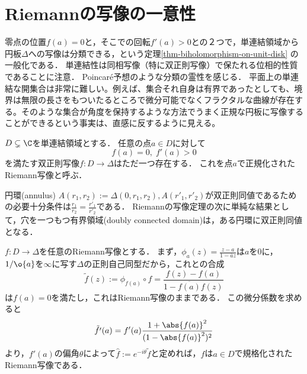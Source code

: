 \documentclass[uplatex, dvipdfmx]{jsreport}
\begin{document}
\section{Riemannの写像の一意性}

\begin{tcolorbox}[colframe=ForestGreen, colback=ForestGreen!10!white,breakable,colbacktitle=ForestGreen!40!white,coltitle=black,fonttitle=\bfseries\sffamily,
title=２次元領域分類の霊性]
    零点の位置$f(a)=0$と，そこでの回転$f'(a)>0$との２つで，単連結領域から円板$\Delta$への写像は分類できる，という定理\ref{thm-biholomorphism-on-unit-disk}
    の一般化である．
    単連結性は同相写像（特に双正則写像）で保たれる位相的性質であることに注意．
    Poincaré予想のような分類の霊性を感じる．
    平面上の単連結な開集合は非常に難しい。例えば、集合それ自身は有界であったとしても、境界は無限の長さをもついたるところで微分可能でなくフラクタルな曲線が存在する。そのような集合が角度を保持するような方法でうまく正規な円板に写像することができるという事実は、直感に反するように見える。
\end{tcolorbox}

\begin{theorem}\label{thm-Riemann-mapping-theorem}
    $D\subsetneq\C$を単連結領域とする．
    任意の点$a\in D$に対して
    \[f(a)=0,\;f'(a)>0\]
    を満たす双正則写像$f:D\to\Delta$はただ一つ存在する．
    これを点$a$で正規化されたRiemann写像と呼ぶ．
\end{theorem}
\begin{remark}[単連結でない領域の消息]
    円環(annulus) $A(r_1,r_2):=\Delta(0,r_1,r_2),A(r'_1,r'_2)$が双正則同値であるための必要十分条件は$\frac{r_1}{r_2}=\frac{r'_1}{r'_2}$である．
    Riemannの写像定理の次に単純な結果として，穴を一つもつ有界領域(doubly connected domain)は，ある円環に双正則同値となる．
\end{remark}

\begin{discussion}
    $f:D\to\Delta$を任意のRiemann写像とする．
    まず，$\phi_a(z)=\frac{z-a}{1-\overline{a}z}$は$a$を$0$に，$1/\o{a}$を$\infty$に写す$\Delta$の正則自己同型だから，これとの合成
    \[\tilde{f}(z):=\phi_{f(a)}\circ f=\frac{f(z)-f(a)}{1-\overline{f(a)}f(z)}\]
    は$f(a)=0$を満たし，これはRiemann写像のままである．
    この微分係数を求めると
    \[\tilde{f'}(a)=f'(a)\frac{1+\abs{f(a)}^2}{(1-\abs{f(a)}^2)^2}\]
    より，$f'(a)$の偏角$\theta$によって$\hat{f}:=e^{-i\theta}\tilde{f}$と定めれば，$\hat{f}$は$a\in D$で規格化されたRiemann写像である．
\end{discussion}
\end{document}
